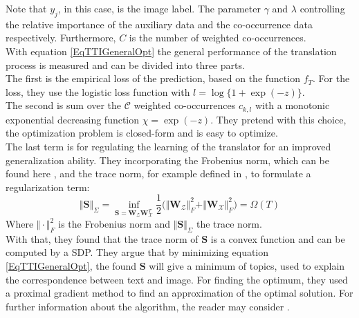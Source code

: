 Note that $y_j$, in this case, is the image label.
The parameter $\gamma$ and $\lambda$ controlling the relative importance of the auxiliary data and the co-occurrence data respectively.
Furthermore, $C$ is the number of weighted co-occurrences.\\
With equation \eqref{EqTTIGeneralOpt} the general performance of the translation process is measured and can be divided into three parts.\\
The first is the empirical loss of the prediction, based on the function $f_T$.\cite{Qi.2011}
For the loss, they use the logistic loss function with $l = \log\{1+\exp(-z) \}$.\\
The second is sum over the $\mathcal{C}$ weighted co-occurrences $c_{k,l}$ with a monotonic exponential decreasing function $\chi = \exp(-z)$.
They pretend with this choice, the optimization problem is closed-form and is easy to optimize.\\
The last term is for regulating the learning of the translator for an improved generalization ability.
They incorporating the Frobenius norm, which can be found here \cite{Ma.1994}, and the trace norm, for example defined in \cite{Rennie.2005}, to formulate a regularization term:\cite{Qi.2011}
\begin{equation}\label{EqTTITrace}
\Vert \mathbf{S}\Vert_\Sigma = \inf_{\mathbf{S} = \mathbf{W}_\mathcal{Z} \mathbf{W}_\mathcal{X}^T} \frac{1}{2}\bigg(\Vert\mathbf{W}_\mathcal{Z}\Vert_F^2 + \Vert\mathbf{W}_\mathcal{X}\Vert_F^2 \bigg) = \Omega(T)
\end{equation}
Where $\Vert \cdot \Vert_F^2$ is the Frobenius norm and $\Vert \mathbf{S}\Vert_\Sigma$ the trace norm.\\
With that, they found that the trace norm of $\mathbf{S}$ is a convex function and can be computed by a \acl{SDP}.
They argue that by minimizing equation \eqref{EqTTIGeneralOpt}, the found $\mathbf{S}$ will give a minimum of topics, used to explain the correspondence between text and image.
For finding the optimum, they used a proximal gradient method to find an approximation of the optimal solution.
For further information about the algorithm, the reader may consider \cite{Qi.2011}.

